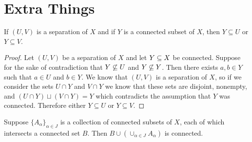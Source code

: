 \newpage
\setcounter{section}{98}
\section{Extra Things}


\setcounter{thm}{0}


\begin{lem}\label{lem:sep}
  If $(U,V)$ is a separation of $X$ and if $Y$ is a connected subset of $X$, then $Y \subseteq U$ or $Y \subseteq V$.
\end{lem}

\begin{proof}
Let $(U,V)$ be a separation of $X$ and let $Y\subseteq X$ be connected. Suppose for the sake of contradiction that $Y\not\subseteq U$ and $Y\not\subseteq Y$. Then there exists $a,b\in Y$ such that $a\in U$ and $b\in Y$. We know that $(U,V)$ is a separation of $X$, so if we consider the sets $U\cap Y$ and $V\cap Y$ we know that these sets are disjoint, nonempty, and $(U\cap Y) \sqcup (V\cap Y) = Y$ which contradicts the assumption that $Y$ was connected. Therefore either $Y \subseteq U$ or $Y \subseteq V$.
\end{proof}


\begin{thm}\label{thm:unionconnected}
  Suppose $\{A_{\alpha}\}_{\alpha\in J}$ is a collection of connected subsets of $X$, each of which intersects a connected set $B$. Then $B\cup(\cup_{\alpha\in J}A_{\alpha})$ is connected.
\end{thm}

